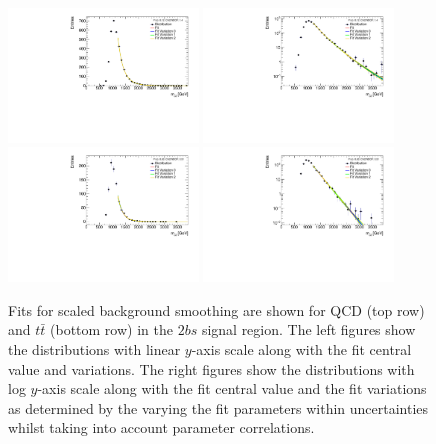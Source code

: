 \begin{figure}[htbp!]
\begin{center}
\includegraphics[width=0.45\textwidth,angle=-90]{figures/boosted/Smooth/qcd_est_TwoTag_split_Signal_mHH_pole.pdf}
\includegraphics[width=0.45\textwidth,angle=-90]{figures/boosted/Smooth/qcd_est_TwoTag_split_Signal_mHH_pole_l.pdf}\\
%   
\includegraphics[width=0.45\textwidth,angle=-90]{figures/boosted/Smooth/ttbar_est_TwoTag_split_Signal_mHH_pole.pdf}
\includegraphics[width=0.45\textwidth,angle=-90]{figures/boosted/Smooth/ttbar_est_TwoTag_split_Signal_mHH_pole_l.pdf}\\
\caption{Fits for scaled background smoothing are shown for QCD (top row) and $t\bar{t}$ (bottom row) in the $2bs$ signal region.  The left figures show the distributions with linear $y$-axis scale along with the fit central value and variations. The right figures show the  distributions with log $y$-axis scale along with the fit central value and the fit variations as determined by the varying the fit parameters within uncertainties whilst taking into account parameter correlations. }
\label{fig:signal-region-mjjscaled-2bs-smoothing}
\end{center}
\end{figure}

